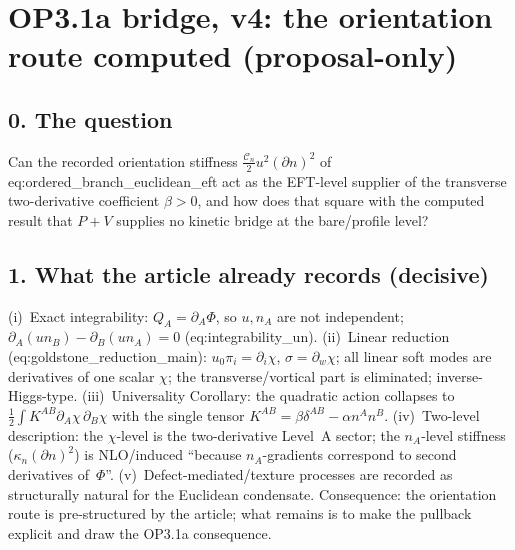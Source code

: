 \section*{OP3.1a bridge, v4: the orientation route computed
(proposal-only)}

\subsection*{0. The question}
Can the recorded orientation stiffness
$\tfrac{\mathcal C_n}{2}u^2(\partial n)^2$
of eq:ordered\_branch\_euclidean\_eft act as the EFT-level
supplier of the transverse two-derivative coefficient $\beta>0$,
and how does that square with the computed result that $P{+}V$
supplies no kinetic bridge at the bare/profile level?

\subsection*{1. What the article already records (decisive)}
(i)~Exact integrability: $Q_A=\partial_A\Phi$, so $u,n_A$ are not
independent; $\partial_A(un_B)-\partial_B(un_A)=0$
(eq:integrability\_un).
(ii)~Linear reduction (eq:goldstone\_reduction\_main):
$u_0\pi_i=\partial_i\chi$, $\sigma=\partial_w\chi$; all linear
soft modes are derivatives of one scalar $\chi$; the
transverse/vortical part is eliminated; inverse-Higgs-type.
(iii)~Universality Corollary: the quadratic action collapses to
$\tfrac12\int K^{AB}\partial_A\chi\,\partial_B\chi$ with the
single tensor $K^{AB}=\beta\delta^{AB}-\alpha n^An^B$.
(iv)~Two-level description: the $\chi$-level is the two-derivative
Level~A sector; the $n_A$-level stiffness
($\kappa_n(\partial n)^2$) is NLO/induced ``because $n_A$-gradients
correspond to second derivatives of~$\Phi$''.
(v)~Defect-mediated/texture processes are recorded as structurally
natural for the Euclidean condensate.
Consequence: the orientation route is pre-structured by the
article; what remains is to make the pullback explicit and draw
the OP3.1a consequence.

